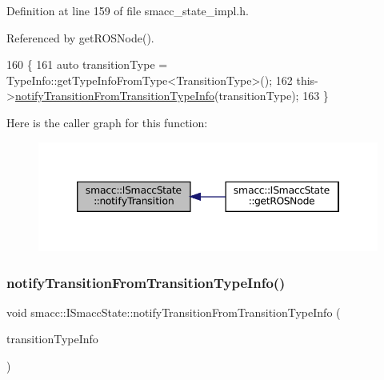 Definition at line 159 of file smacc\+\_\+state\+\_\+impl.\+h.



Referenced by get\+R\+O\+S\+Node().


\begin{DoxyCode}
160 \{
161     \textcolor{keyword}{auto} transitionType = TypeInfo::getTypeInfoFromType<TransitionType>();
162     this->\hyperlink{classsmacc_1_1ISmaccState_acb3dd7d402c634004ae3b67a01169438}{notifyTransitionFromTransitionTypeInfo}(transitionType);
163 \}
\end{DoxyCode}
Here is the caller graph for this function\+:
\nopagebreak
\begin{figure}[H]
\begin{center}
\leavevmode
\includegraphics[width=346pt]{classsmacc_1_1ISmaccState_a98df316afd79180d3c27a15a7d5dd1cf_icgraph}
\end{center}
\end{figure}
\mbox{\label{classsmacc_1_1ISmaccState_acb3dd7d402c634004ae3b67a01169438}} 
\subsubsection{\texorpdfstring{notify\+Transition\+From\+Transition\+Type\+Info()}{notifyTransitionFromTransitionTypeInfo()}}
{\footnotesize\ttfamily void smacc\+::\+I\+Smacc\+State\+::notify\+Transition\+From\+Transition\+Type\+Info (\begin{DoxyParamCaption}\item[{std\+::shared\+\_\+ptr$<$ \hyperlink{classsmacc_1_1introspection_1_1TypeInfo}{smacc\+::introspection\+::\+Type\+Info} $>$ \&}]{transition\+Type\+Info }\end{DoxyParamCaption})}



